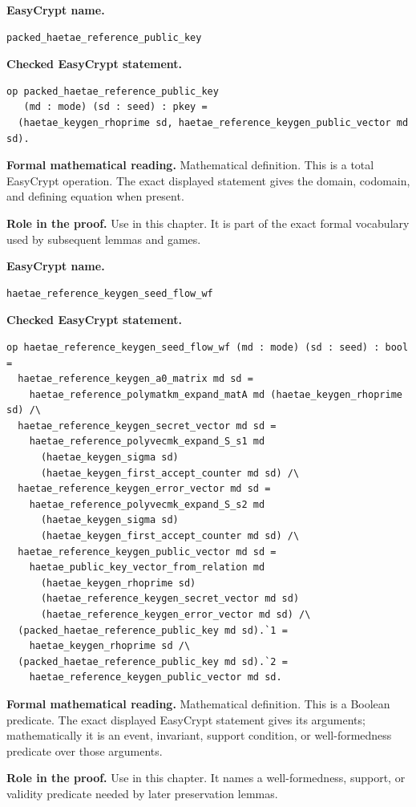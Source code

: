 \begin{formaldefinition}
\noindent\textbf{EasyCrypt name.}
\begin{lstlisting}[language=EasyCrypt,basicstyle=\ttfamily\scriptsize]
packed_haetae_reference_public_key
\end{lstlisting}
\noindent\textbf{Checked EasyCrypt statement.}
\begin{lstlisting}[language=EasyCrypt,basicstyle=\ttfamily\scriptsize]
op packed_haetae_reference_public_key
   (md : mode) (sd : seed) : pkey =
  (haetae_keygen_rhoprime sd, haetae_reference_keygen_public_vector md sd).
\end{lstlisting}
\noindent\textbf{Formal mathematical reading.}
Mathematical definition. This is a total EasyCrypt operation.  The exact displayed statement gives the domain, codomain, and defining equation when present.

\noindent\textbf{Role in the proof.}
Use in this chapter. It is part of the exact formal vocabulary used by subsequent lemmas and games.

\end{formaldefinition}

\begin{formaldefinition}
\noindent\textbf{EasyCrypt name.}
\begin{lstlisting}[language=EasyCrypt,basicstyle=\ttfamily\scriptsize]
haetae_reference_keygen_seed_flow_wf
\end{lstlisting}
\noindent\textbf{Checked EasyCrypt statement.}
\begin{lstlisting}[language=EasyCrypt,basicstyle=\ttfamily\scriptsize]
op haetae_reference_keygen_seed_flow_wf (md : mode) (sd : seed) : bool =
  haetae_reference_keygen_a0_matrix md sd =
    haetae_reference_polymatkm_expand_matA md (haetae_keygen_rhoprime sd) /\
  haetae_reference_keygen_secret_vector md sd =
    haetae_reference_polyvecmk_expand_S_s1 md
      (haetae_keygen_sigma sd)
      (haetae_keygen_first_accept_counter md sd) /\
  haetae_reference_keygen_error_vector md sd =
    haetae_reference_polyvecmk_expand_S_s2 md
      (haetae_keygen_sigma sd)
      (haetae_keygen_first_accept_counter md sd) /\
  haetae_reference_keygen_public_vector md sd =
    haetae_public_key_vector_from_relation md
      (haetae_keygen_rhoprime sd)
      (haetae_reference_keygen_secret_vector md sd)
      (haetae_reference_keygen_error_vector md sd) /\
  (packed_haetae_reference_public_key md sd).`1 =
    haetae_keygen_rhoprime sd /\
  (packed_haetae_reference_public_key md sd).`2 =
    haetae_reference_keygen_public_vector md sd.
\end{lstlisting}
\noindent\textbf{Formal mathematical reading.}
Mathematical definition. This is a Boolean predicate.  The exact displayed EasyCrypt statement gives its arguments; mathematically it is an event, invariant, support condition, or well-formedness predicate over those arguments.

\noindent\textbf{Role in the proof.}
Use in this chapter. It names a well-formedness, support, or validity predicate needed by later preservation lemmas.

\end{formaldefinition}

